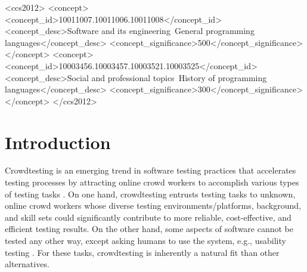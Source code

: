 \documentclass[sigconf,review, anonymous]{acmart}
\begin{document}
\begin{CCSXML}
<ccs2012>
<concept>
<concept_id>10011007.10011006.10011008</concept_id>
<concept_desc>Software and its engineering~General programming languages</concept_desc>
<concept_significance>500</concept_significance>
</concept>
<concept>
<concept_id>10003456.10003457.10003521.10003525</concept_id>
<concept_desc>Social and professional topics~History of programming languages</concept_desc>
<concept_significance>300</concept_significance>
</concept>
</ccs2012>
\end{CCSXML}








\maketitle


\section{Introduction}
\label{sec:intro}
Crowdtesting is an emerging trend in software testing practices that accelerates testing processes by attracting online crowd workers to accomplish various types of testing tasks \cite{mao2017survey,chen2018research,link_crowdtest,wang2017domain,cui2017who}. On one hand, crowdtesting entrusts testing tasks to unknown, online crowd workers whose diverse testing environments/platforms, background, and skill sets could significantly contribute to more reliable, cost-effective, and efficient testing results. On the other hand, some aspects of software cannot be tested any other way, except asking humans to use the system, e.g., usability testing \cite{gomide2014affective}. For these tasks, crowdtesting is inherently a natural fit than other alternatives. 
\end{document}
